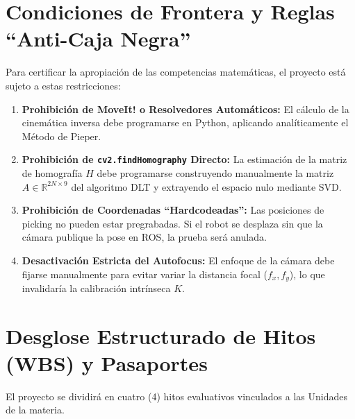 \documentclass[11pt,a4paper]{article}
\begin{document}
\section{Condiciones de Frontera y Reglas ``Anti-Caja Negra''}
Para certificar la apropiación de las competencias matemáticas, el proyecto está sujeto a estas restricciones:
\begin{enumerate}
    \item \textbf{Prohibición de MoveIt! o Resolvedores Automáticos:} El cálculo de la cinemática inversa debe programarse en Python, aplicando analíticamente el Método de Pieper.
    \item \textbf{Prohibición de \texttt{cv2.findHomography} Directo:} La estimación de la matriz de homografía $H$ debe programarse construyendo manualmente la matriz $A \in \mathbb{R}^{2N \times 9}$ del algoritmo DLT y extrayendo el espacio nulo mediante SVD.
    \item \textbf{Prohibición de Coordenadas ``Hardcodeadas'':} Las posiciones de picking no pueden estar pregrabadas. Si el robot se desplaza sin que la cámara publique la pose en ROS, la prueba será anulada.
    \item \textbf{Desactivación Estricta del Autofocus:} El enfoque de la cámara debe fijarse manualmente para evitar variar la distancia focal ($f_x, f_y$), lo que invalidaría la calibración intrínseca $K$.
\end{enumerate}

\section{Desglose Estructurado de Hitos (WBS) y Pasaportes}
El proyecto se dividirá en cuatro (4) hitos evaluativos vinculados a las Unidades de la materia.
\end{document}
